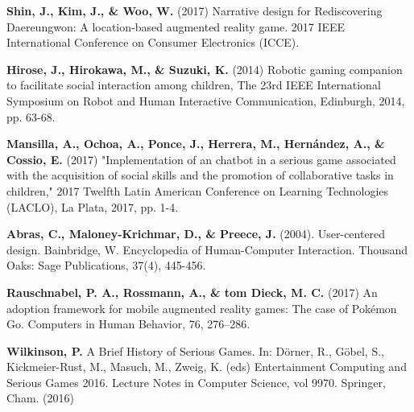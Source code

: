\documentclass[runningheads]{llncs}
\begin{document}
\begin{thebibliography}{8}
 \textbf{ Shin, J., Kim, J., \& Woo, W.} (2017) Narrative design for Rediscovering Daereungwon: A location-based augmented reality game. 2017 IEEE International Conference on Consumer Electronics (ICCE). 

 \textbf{Hirose, J., Hirokawa, M., \& Suzuki, K.} (2014) Robotic gaming companion to facilitate social interaction among children, The 23rd IEEE International Symposium on Robot and Human Interactive Communication, Edinburgh, 2014, pp. 63-68. 

 \textbf{Mansilla, A., Ochoa, A., Ponce, J., Herrera, M., Hernández, A., \& Cossio, E.} (2017) "Implementation of an chatbot in a serious game associated with the acquisition of social skills and the promotion of collaborative tasks in children," 2017 Twelfth Latin American Conference on Learning Technologies (LACLO), La Plata, 2017, pp. 1-4.

 \textbf{Abras, C., Maloney-Krichmar, D., \& Preece, J.} (2004). User-centered design. Bainbridge, W. Encyclopedia of Human-Computer Interaction. Thousand Oaks: Sage Publications, 37(4), 445-456.

 \textbf{Rauschnabel, P. A., Rossmann, A., \& tom Dieck, M. C.} (2017) An adoption framework for mobile augmented reality games: The case of Pokémon Go. Computers in Human Behavior, 76, 276–286. 

 \textbf{Wilkinson, P.} A Brief History of Serious Games. In: Dörner, R., Göbel, S., Kickmeier-Rust, M., Masuch, M., Zweig, K. (eds) Entertainment Computing and Serious Games 2016. Lecture Notes in Computer Science, vol 9970. Springer, Cham. (2016) 







\end{thebibliography}
\end{document}
